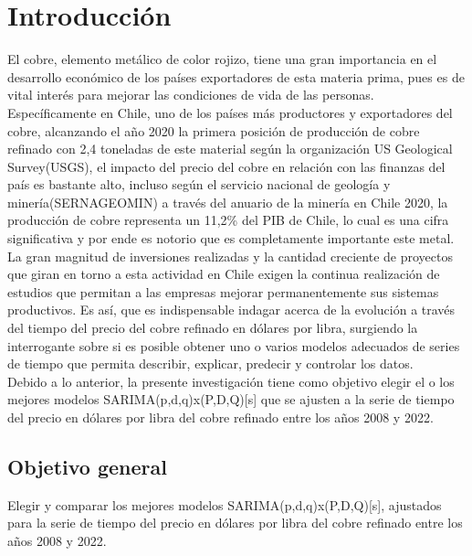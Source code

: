 \documentclass{report}
\begin{document}


\tableofcontents

\chapter{Introducción}\label{intro}
El cobre, elemento metálico de color rojizo, tiene una gran importancia en el desarrollo económico de los países exportadores de esta materia prima, pues es de vital interés para mejorar las condiciones de vida de las personas.\\

Específicamente en Chile, uno de los países más productores y exportadores del cobre, alcanzando el año 2020 la primera posición de producción de cobre refinado con 2,4 toneladas de este material según la organización US Geological Survey(USGS), el impacto del precio del cobre en relación con las finanzas del país es bastante alto, incluso según el servicio nacional de geología y minería(SERNAGEOMIN) a través del anuario de la minería en Chile 2020, la producción de cobre representa un 11,2\% del PIB de Chile, lo cual es una cifra significativa y por ende es notorio que es completamente importante este metal.\\

La gran magnitud de inversiones realizadas y la cantidad creciente de proyectos que giran en torno a esta actividad en Chile exigen la continua realización de estudios que permitan a las empresas mejorar permanentemente sus sistemas productivos. Es así, que es indispensable indagar acerca de la evolución a través del tiempo del precio del cobre refinado en dólares por libra, surgiendo la interrogante sobre si es posible obtener uno o varios modelos adecuados de series de tiempo que permita describir, explicar, predecir y controlar los datos.\\

Debido a lo anterior, la presente investigación tiene como objetivo elegir el o los mejores modelos SARIMA(p,d,q)x(P,D,Q)[s] que se ajusten a la serie de tiempo del precio en dólares por libra del cobre refinado entre los años 2008 y 2022.\\


\newpage
\section{Objetivo general}\label{objetivo general}
Elegir y comparar los mejores modelos SARIMA(p,d,q)x(P,D,Q)[s], ajustados para la serie de tiempo del precio en dólares por libra del cobre refinado entre los años 2008 y 2022.
\end{document}
